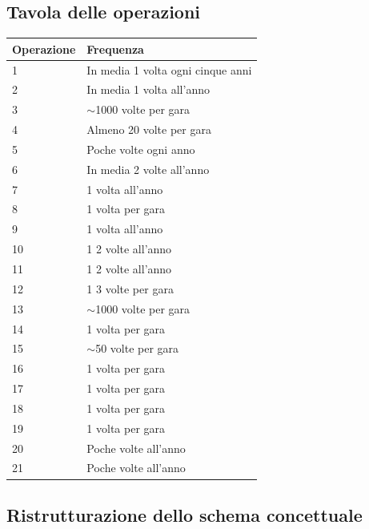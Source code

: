 \documentclass[11pt]{article}
\begin{document}
\subsection{Tavola delle operazioni}
\begin{center}
    \begin{tabular}{ |l|l| }
        \hline
        \textbf{Operazione} & \textbf{Frequenza} \\

        \hline
        1 & In media 1 volta ogni cinque anni \\
        \hline
        2 & In media 1 volta all'anno \\
        \hline
        3 & $\sim$1000 volte per gara \\
        \hline
        4 & Almeno 20 volte per gara \\ 
        \hline
        5 & Poche volte ogni anno \\
        \hline
        6 & In media 2 volte all'anno \\ 
        \hline
        7 & 1 volta all'anno \\
        \hline
        8 & 1 volta per gara \\
        \hline
        9 & 1 volta all'anno \\
        \hline
        10 & 1 2 volte all'anno \\
        \hline
        11 & 1 2 volte all'anno \\
        \hline
        12 & 1 3 volte per gara \\
        \hline
        13 & $\sim$1000 volte per gara \\
        \hline
        14 & 1 volta per gara \\
        \hline
        15 & $\sim$50 volte per gara \\
        \hline
        16 & 1 volta per gara \\
        \hline
        17 & 1 volta per gara \\
        \hline
        18 & 1 volta per gara \\
        \hline
        19 & 1 volta per gara \\
        \hline
        20 & Poche volte all'anno \\
        \hline
        21 & Poche volte all'anno \\
        \hline
    \end{tabular}
\end{center}

\subsection{Ristrutturazione dello schema concettuale}
\end{document}
